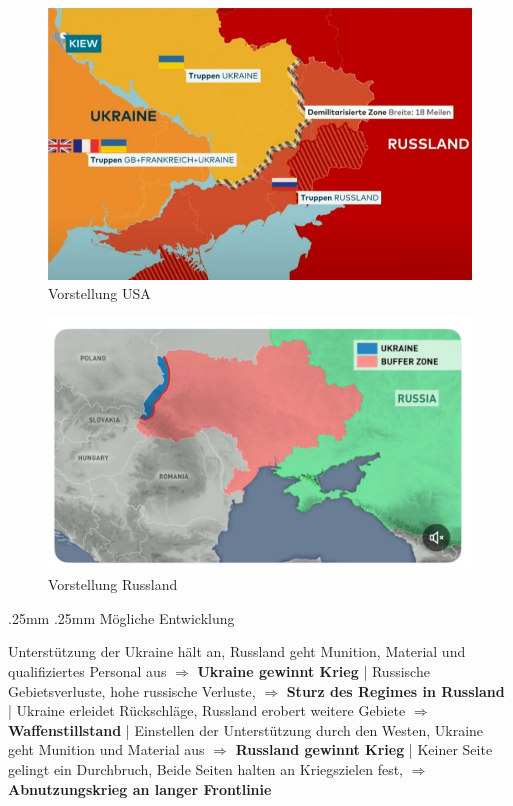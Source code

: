 {}\documentclass[a4paper,landscape,twoside]{article}
\makeatletter
\renewcommand{\subsection}{\@startsection{subsection}{2}{\z@}%
	{.25mm}%
	{.25mm}%
	{\normalfont\small\bfseries}}
\makeatother
\begin{document}
\begin{multicols}{4}
	\begin{figure}[H]
		\centering
		\includegraphics[width=.91\columnwidth]{images/buffer-usa.png}
		\caption{Vorstellung USA}
	\end{figure}
	\begin{figure}[H]
		\centering
		\includegraphics[width=.95\columnwidth]{images/buffer-rf.jpg}
		\caption{Vorstellung Russland}
	\end{figure}


	\subsection{Mögliche Entwicklung}

	Unterstützung der Ukraine hält an,
	Russland geht Munition, Material und qualifiziertes Personal aus
	$\Rightarrow$
	\textbf{Ukraine gewinnt Krieg}
	|
	Russische Gebietsverluste,
	hohe russische Verluste,
	$\Rightarrow$
	\textbf{Sturz des Regimes in Russland}
	|
	Ukraine erleidet Rückschläge,
	Russland erobert weitere Gebiete
	$\Rightarrow$
	\textbf{Waffenstillstand}
	|
	Einstellen der Unterstützung durch den Westen,
	Ukraine geht Munition und Material aus
	$\Rightarrow$
	\textbf{Russland gewinnt Krieg}
	|
	Keiner Seite gelingt ein Durchbruch,
	Beide Seiten halten an Kriegszielen fest,
	$\Rightarrow$
	\textbf{Abnutzungskrieg an langer Frontlinie}


\end{multicols}
\end{document}
